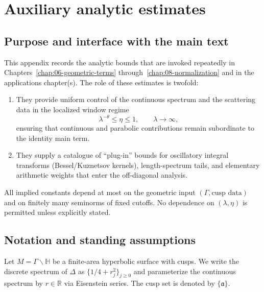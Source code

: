 
\appendix
\chapter{Auxiliary analytic estimates}
\label{app:B-auxiliary-estimates}

\section{Purpose and interface with the main text}
\label{sec:B.scope}

This appendix records the analytic bounds that are invoked repeatedly in Chapters~\ref{chap:06-geometric-terms}
through~\ref{chap:08-normalization} and in the applications chapter(s).  The role of these estimates is twofold:

\begin{enumerate}
\item They provide uniform control of the continuous spectrum and the scattering data in the localized window regime
\[
\lambda^{-\theta}\le \eta\le 1,\qquad \lambda\to\infty,
\]
ensuring that continuous and parabolic contributions remain subordinate to the identity main term.

\item They supply a catalogue of ``plug-in'' bounds for oscillatory integral transforms (Bessel/Kuznetsov kernels),
length-spectrum tails, and elementary arithmetic weights that enter the off-diagonal analysis.
\end{enumerate}

All implied constants depend at most on the geometric input $(\Gamma,\text{cusp data})$ and on finitely many seminorms
of fixed cutoffs.  No dependence on $(\lambda,\eta)$ is permitted unless explicitly stated.

\section{Notation and standing assumptions}
\label{sec:B.notation}

Let $M=\Gamma\backslash\mathbb{H}$ be a finite-area hyperbolic surface with cusps.  We write the discrete spectrum of
$\Delta$ as $\{1/4+r_j^2\}_{j\ge 0}$ and parameterize the continuous spectrum by $r\in\mathbb{R}$ via Eisenstein series.
The cusp set is denoted by $\{\mathfrak{a}\}$.

